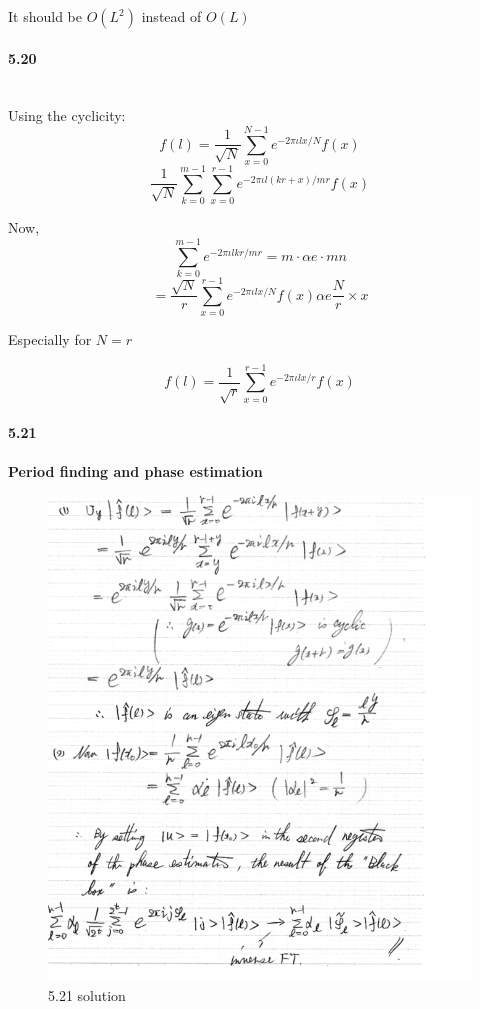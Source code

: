 It should be $O(L^2)$ instead of $O(L)$

\paragraph{5.20} \textbf{}
\\

Using the cyclicity:
$$ f(l) = \frac{1}{\sqrt{N}} \sum_{x=0}^{N-1} e^{-2 \pi \iota l x/N} f(x)$$
$$ \frac{1}{\sqrt{N}} \sum_{k=0}^{m-1} \sum_{x=0}^{r-1} e^{-2 \pi \iota  l (kr + x)/mr} f(x) $$

Now,
$$ \sum_{k=0}^{m-1} e^{-2 \pi \iota l k r /mr} = m \cdot \alpha e \cdot mn$$
$$ = \frac{\sqrt{N}}{r} \sum_{x=0}^{r-1} e^{- 2 \pi \iota l x /N} f(x) \alpha e \frac{N}{r}\times x$$

Especially for $N = r$

$$ f(l) = \frac{1}{\sqrt{r}} \sum_{x=0}^{r-1} e^{- 2 \pi \iota l x/ r} f(x)$$


\paragraph{5.21} \textbf{Period finding and phase estimation}
\\
\begin{figure}[h!]
    \centering
    \includegraphics{Chapter 5/Ex 5.21 soln.png}
    \caption{5.21 solution}
    \label{fig:my_label}
\end{figure}

